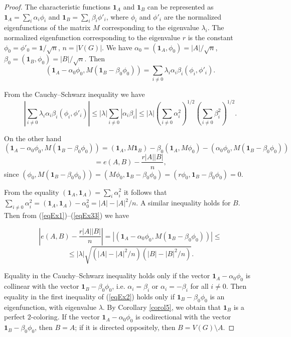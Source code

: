\documentclass[11pt]{article}
\theoremstyle{definition}
\begin{document}
\begin{proof}
The characteristic functions $\mathbf{1}_{A}$ and $\mathbf{1}_{B}$ can be represented as
$\mathbf{1}_{A}=\sum_i\alpha_i\phi_i$ and
$\mathbf{1}_{B}=\sum_i\beta_i\phi'_i$, where $\phi_i$ and $\phi'_i$ are the normalized eigenfunctions of the matrix $M$ corresponding
to the eigenvalue $\lambda_i$. The normalized eigenfunction
corresponding to the eigenvalue $r$ is the constant
$\phi_0=\phi'_0=\mathbf{1}/\sqrt{n}$, $n=|V(G)|$. We have
$\alpha_0=(\mathbf{1}_{A},\phi_0)=|A|/\sqrt{n}$,
$\beta_0=(\mathbf{1}_{B},\phi_0)=|B|/\sqrt{n}$. Then
\begin{equation}\label{eqEx1}
(\mathbf{1}_{A}-\alpha_0\phi_0, M(\mathbf{1}_{B}-\beta_0\phi_0))=
\sum\limits_{i\neq 0}\lambda_i\alpha_i\beta_i(\phi_i,\phi'_i).
\end{equation}

From the Cauchy--Schwarz  inequality we have
\begin{equation}\label{eqEx2}
|\sum\limits_{i\neq 0}\lambda_i\alpha_i\beta_i(\phi_i,\phi'_i)|\leq
|\lambda|\sum\limits_{i\neq 0}|\alpha_i\beta_i|\leq
|\lambda|(\sum\limits_{i\neq 0}\alpha^2_i)^{1/2}(\sum\limits_{i\neq
0}\beta^2_i)^{1/2}.
\end{equation}

On the other hand
$$(\mathbf{1}_{A}-\alpha_0\phi_0, M(\mathbf{1}_{B}-\beta_0\phi_0))=(\mathbf{1}_{A},
M\mathbf{1}_{B})-\beta_0(\mathbf{1}_{A}, M\phi_0)-(\alpha_0\phi_0, M(\mathbf{1}_{B}-\beta_0\phi_0))
$$
\begin{equation}\label{eqEx33}
 =e(A,B)-\frac{r|A||B|}{n},
\end{equation}
since $(\phi_0, M(\mathbf{1}_{B}-\beta_0\phi_0))=(M\phi_0, \mathbf{1}_{B}-\beta_0\phi_0)=
(r\phi_0, \mathbf{1}_{B}-\beta_0\phi_0)=0$.

From the equality $(\mathbf{1}_{A},\mathbf{1}_{A})= \sum_i\alpha^2_i$ it follows that
$\sum\limits_{i\neq 0}\alpha^2_i=
(\mathbf{1}_{A},\mathbf{1}_{A})-\alpha^2_0=|A|- |A|^2/n$. A similar
inequality holds for $B$. Then from 
(\ref{eqEx1})--(\ref{eqEx33}) we have

$$\left|e(A,B)-\frac{r|A||B|}{n}\right|=
|(\mathbf{1}_{A}-\alpha_0\phi_0, M(\mathbf{1}_{B}-\beta_0\phi_0))|\leq$$
$$\leq |\lambda|\sqrt{(|A|- |A|^2/n)(|B|- |B|^2/n)}.$$

Equality in the Cauchy--Schwarz inequality holds only
if the vector $\mathbf{1}_{A}-\alpha_0\phi_0$ is collinear
with the vector $\mathbf{1}_{B}-\beta_0\phi_0$, i.e. $ \alpha_i=\beta_i$ or $
\alpha_i=-\beta_i$ for all $i\neq 0$. Then
equality in the first inequality of (\ref{eqEx2}) holds only if
 $\mathbf{1}_{B}-\beta_0\phi_0$ is an eigenfunction, with
eigenvalue $\lambda$. By Corollary \ref{corol5}, we obtain that ${\mathbf 1}_{B}$
is a perfect $2$-coloring. If the vector
$\mathbf{1}_{A}-\alpha_0\phi_0$ is codirectional with the vector
$\mathbf{1}_{B}-\beta_0\phi_0$, then $B=A$; if it is 
directed oppositely, then $B=V(G)\setminus A$. \end{proof}
\end{document}
